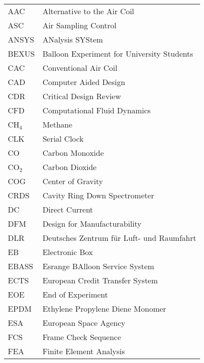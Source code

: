 
  
     \begin{longtable}{p{3cm} p{9cm}}
             AAC         & Alternative to the Air Coil\\
             ASC         & Air Sampling Control\\
             ANSYS       & ANalysis SYStem\\
             BEXUS       & Balloon Experiment for University Students\\
             CAC         & Conventional Air Coil\\
             CAD         & Computer Aided Design \\
             CDR         & Critical Design Review\\
             CFD         & Computational Fluid Dynamics\\
             CH$_{4}$    & Methane\\
             CLK         & Serial Clock\\
             CO          & Carbon Monoxide\\
             CO$_{2}$    & Carbon Dioxide\\
             COG         & Center of Gravity \\
             CRDS        & Cavity Ring Down Spectrometer\\
             DC          & Direct Current\\
             DFM         & Design for Manufacturability \\
             DLR         & Deutsches Zentrum f{\"u}r Luft- und Raumfahrt \\
             EB          & Electronic Box \\
             EBASS       & Esrange BAlloon Service System\\
             ECTS        & European Credit Transfer System\\
             EOE         & End of Experiment\\
             EPDM        & Ethylene Propylene Diene Monomer\\
             ESA         & European Space Agency \\
             FCS         & Frame Check Sequence\\
             FEA         & Finite Element Analysis\\

\end{longtable}
